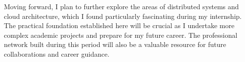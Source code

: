\documentclass[12pt,a4paper]{report}
\begin{document}
Moving forward, I plan to further explore the areas of distributed systems and cloud architecture, which I found particularly fascinating during my internship. The practical foundation established here will be crucial as I undertake more complex academic projects and prepare for my future career. The professional network built during this period will also be a valuable resource for future collaborations and career guidance.
\end{document}
